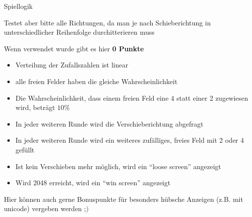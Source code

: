 \documentclass[ngerman,accentcolor=3c,colorbacktitle,12pt,T1,points=true, RGB]{tudaexercise}
\begin{document}
\begin{task}[points=auto]{Spiellogik}
\begin{subtask}[points=25,title={Verschmelzen}]
\begin{center}
        \end{center}
        Testet aber bitte alle Richtungen, da man je nach Schieberichtung in unterschiedlicher Reihenfolge durchitterieren muss
    \end{subtask}
    \begin{subtask}[points=15,title={Zufall}]
        Wenn  verwendet wurde gibt es hier \textbf{0 Punkte}
        \begin{itemize}
            \item Verteilung der Zufallszahlen ist linear
            \item alle freien Felder haben die gleiche Wahrscheinlichkeit
            \item  Die Wahrscheinlichkeit, dass einem freien Feld eine 4 statt einer 2 zugewiesen wird,
                beträgt $10\%$
        \end{itemize}
    \end{subtask}
    \begin{subtask}[points=20,title={Spieleablauf (nach Startzustand)}]
        \begin{itemize}
            \item In jeder weiteren Runde wird die Verschieberichtung abgefragt
            \item In jeder weiteren Runde wird ein weiteres zufälliges, freies Feld mit 2 oder 4 gefüllt
            \item Ist kein Verschieben mehr möglich, wird ein \enquote{loose screen} angezeigt
            \item Wird 2048 erreicht, wird ein \enquote{win screen} angezeigt
        \end{itemize}
    \end{subtask}
    \begin{subtask}[points=10,title={Anzeige}]
        Hier können auch gerne Bonuspunkte für besonders hübsche Anzeigen (z.B. mit unicode) vergeben werden ;$)$

\end{subtask}
\end{task}
\end{document}
